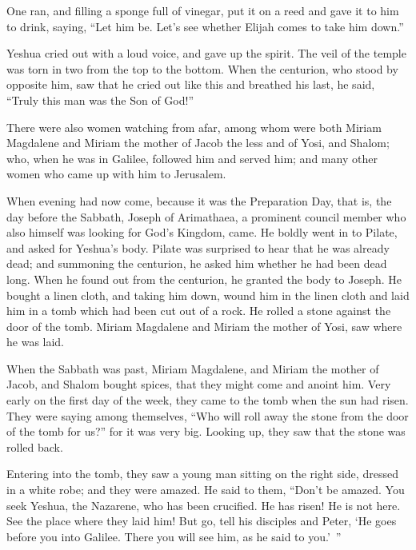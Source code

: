 \myverse{}One ran, and filling a sponge full of vinegar, put it on a reed
and gave it to him to drink, saying, “Let him be. Let’s see whether Elijah comes to take him down.”

\myverse{}Yeshua cried out with a loud voice, and gave up the spirit.
\myverse{}The veil of the temple was torn in two from the top to the bottom.
\myverse{}When the centurion, who stood by opposite him, saw that he cried out like
this and breathed his last, he said, “Truly this man was the Son of God!”

\myverse{}There were also women watching from afar, among whom were both
Miriam Magdalene and Miriam the mother of Jacob the less and of Yosi, and Shalom;
\myverse{}who, when he was in Galilee, followed him and served him; and many other
women who came up with him to Jerusalem.

\myverse{}When evening had now come, because it was the Preparation Day,
that is, the day before the Sabbath,
\myverse{}Joseph of Arimathaea, a prominent council member who also himself was looking
for God’s Kingdom, came. He boldly went in to Pilate, and asked for Yeshua’s body.
\myverse{}Pilate was surprised to hear that he was already dead; and summoning the
centurion, he asked him whether he had been dead long.
\myverse{}When he found out from the centurion, he granted the body to Joseph.
\myverse{}He bought a linen cloth, and taking him down, wound him in the linen cloth
and laid him in a tomb which had been cut out of a rock. He rolled a stone against the door of the tomb.
\myverse{}Miriam Magdalene and Miriam the mother of Yosi, saw where he was laid.


\mychapter{} \myverse*{}When the Sabbath was past, Miriam Magdalene, and Miriam the mother
of Jacob, and Shalom bought spices, that they might come and anoint him.
\myverse{}Very early on the first day of the week, they came to the tomb when the sun
had risen.
\myverse{}They were saying among themselves, “Who will roll away the stone from the door
of the tomb for us?”
\myverse{}for it was very big. Looking up, they saw that the stone was rolled back.

\myverse{}Entering into the tomb, they saw a young man sitting on the right
side, dressed in a white robe; and they were amazed.
\myverse{}He said to them, “Don’t be amazed. You seek Yeshua, the Nazarene, who has been
crucified. He has risen! He is not here. See the place where they laid him!
\myverse{}But go, tell his disciples and Peter, ‘He goes before you into Galilee. There
you will see him, as he said to you.’ ”

